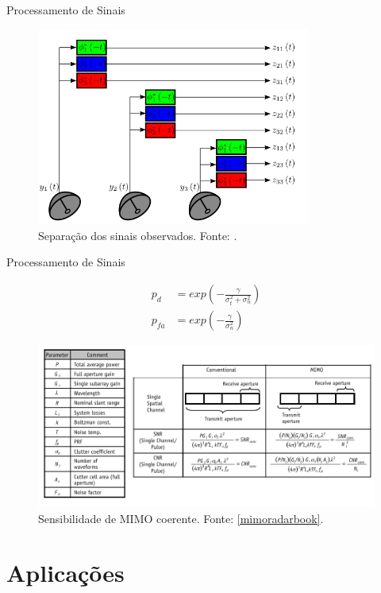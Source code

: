 \documentclass[portuguese]{beamer}
\begin{document}
\begin{frame}{Processamento de Sinais}
  \begin{figure}[]
	\centering
	\includegraphics[height=6.5cm]{../report/graphics/processor.png}
	\caption{Separação dos sinais observados. Fonte: \cite{davis2015mimo}.}
	\label{fig:proc}
  \end{figure}
\end{frame}

\begin{frame}{Processamento de Sinais}
  \par
  \small
  \begin{align*}
    p_d &= exp\left( -\frac{\gamma}{\sigma_t^2 + \sigma_n^2} \right)  \\
    p_{fa} &= exp\left( -\frac{\gamma}{\sigma_n^2} \right) 
  \end{align*}
  \begin{figure}[]
	\centering
	\includegraphics[width=0.9\linewidth]{../report/graphics/table.png}
	\caption{Sensibilidade de MIMO coerente. Fonte: \ref{mimoradarbook}.}
	\label{fig:tabela}
  \end{figure}
\end{frame}

\section{Aplicações}
\end{document}
